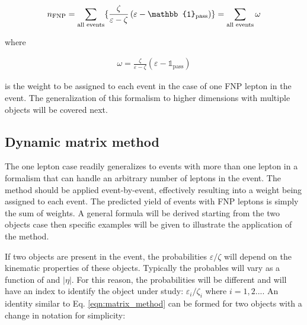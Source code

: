 \[
n_\text{FNP} = \sum_\text{all events} \{
\frac{\zeta}{\varepsilon - \zeta}\left(\varepsilon - 
\mathbb{1}_\text{pass}\right)
\}
\\
=  \sum_\text{all events} \omega
\]

where 

\begin{align}
  \omega = \frac{\zeta}{\varepsilon - \zeta}\left(\varepsilon - 
\mathbb{1}_\text{pass}\right)
  \label{eqn:fake.nFNPpass.demo}
\end{align}

is the weight to be assigned to each event in the case of one FNP lepton 
in the event. 
The generalization of this formalism to higher dimensions 
with multiple objects will be covered next.



\subsection{Dynamic matrix method}


The one lepton case readily generalizes to events with more than one lepton
in a formalism that can handle an arbitrary number of leptons 
in the event. The method should be applied event-by-event, effectively 
resulting into a weight being assigned to each event. The predicted yield of 
events with FNP leptons is simply the sum of weights.
A general formula will be derived starting from the two objects case 
then specific examples will be given to illustrate the application of the 
method.

If two objects are present in the event, the probabilities $\varepsilon/\zeta$
will depend on the kinematic properties of these objects. Typically 
the probables will vary as a function of \pt and $|\eta|$. For this reason,
the probabilities will be different and will have an index to 
identify the object under study: 
 $\varepsilon_i/\zeta_i$ where $i=1,2...$. 
An identity similar to Eq.  \ref{eqn:matrix_method} can be formed for 
two objects with a change in notation for simplicity:

